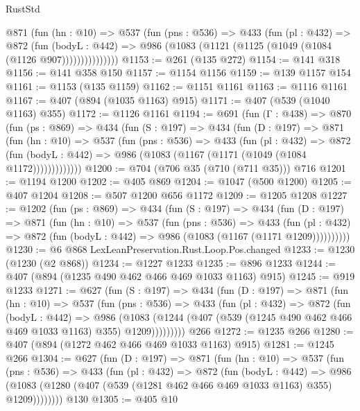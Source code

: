 \begin{lexlean}{RustStd}
\begin{coremodule}
            @871
              (fun (hn : @10) =>
              @537
                (fun (pns : @536) =>
                @433
                  (fun (pl : @432) =>
                  @872
                    (fun (bodyL : @442) =>
                    @986 (@1083 (@1121 (@1125 (@1049 (@1084 (@1126 @907)))))))))))))))
@1153 := @261 (@135 @272)
@1154 := @141 @318
@1156 := @141 @358 @150
@1157 := @1154 @1156
@1159 := @139 @1157 @154
@1161 := @1153 (@135 @1159)
@1162 := @1151 @1161
@1163 := @1116 @1161
@1167 := @407 (@894 (@1035 @1163) @915)
@1171 := @407 (@539 (@1040 @1163) @355)
@1172 := @1126 @1161
@1194 := @691
    (fun (Γ : @438) =>
    @870
      (fun (ps : @869) =>
      @434
        (fun (S : @197) =>
        @434
          (fun (D : @197) =>
          @871
            (fun (hn : @10) =>
            @537
              (fun (pns : @536) =>
              @433
                (fun (pl : @432) =>
                @872
                  (fun (bodyL : @442) => @986 (@1083 (@1167 (@1171 (@1049 (@1084 @1172)))))))))))))
@1200 := @704 (@706 @35 (@710 (@711 @35))) @716
@1201 := @1194 @1200
@1202 := @405 @869
@1204 := @1047 (@500 @1200)
@1205 := @407 @1204
@1208 := @507 @1200 @656 @1172
@1209 := @1205 @1208
@1227 := @1202
    (fun (ps : @869) =>
    @434
      (fun (S : @197) =>
      @434
        (fun (D : @197) =>
        @871
          (fun (hn : @10) =>
          @537
            (fun (pns : @536) =>
            @433
              (fun (pl : @432) =>
              @872 (fun (bodyL : @442) => @986 (@1083 (@1167 (@1171 @1209))))))))))
@1230 := @6 @868 LexLeanPreservation.Rust.Loop.Pos.changed
@1233 := @1230 (@1230 (@2 @868))
@1234 := @1227 @1233
@1235 := @896 @1233
@1244 := @407 (@894 (@1235 @490 @462 @466 @469 @1033 @1163) @915)
@1245 := @919 @1233
@1271 := @627
    (fun (S : @197) =>
    @434
      (fun (D : @197) =>
      @871
        (fun (hn : @10) =>
        @537
          (fun (pns : @536) =>
          @433
            (fun (pl : @432) =>
            @872
              (fun (bodyL : @442) =>
              @986
                (@1083
                  (@1244 (@407 (@539 (@1245 @490 @462 @466 @469 @1033 @1163) @355) @1209)))))))))
    @266
@1272 := @1235 @266
@1280 := @407 (@894 (@1272 @462 @466 @469 @1033 @1163) @915)
@1281 := @1245 @266
@1304 := @627
    (fun (D : @197) =>
    @871
      (fun (hn : @10) =>
      @537
        (fun (pns : @536) =>
        @433
          (fun (pl : @432) =>
          @872
            (fun (bodyL : @442) =>
            @986 (@1083 (@1280 (@407 (@539 (@1281 @462 @466 @469 @1033 @1163) @355) @1209))))))))
    @130
@1305 := @405 @10

\end{coremodule}
\end{lexlean}
